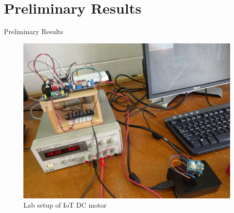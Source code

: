 \documentclass{beamer}
\begin{document}
\section{Preliminary Results}
\begin{frame}{Preliminary Results}
\begin{figure}
\includegraphics[scale=0.05]{figs/motorSetup.jpg}
\caption{Lab setup of IoT DC motor}
\end{figure}
\end{frame}
\end{document}
